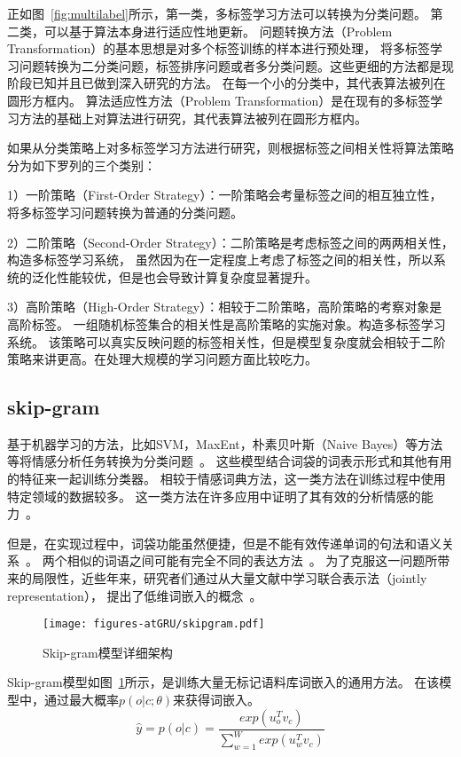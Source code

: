 正如图~\ref{fig:multilabel}所示，第一类，多标签学习方法可以转换为分类问题。
第二类，可以基于算法本身进行适应性地更新。
问题转换方法（Problem Transformation）的基本思想是对多个标签训练的样本进行预处理，
将多标签学习问题转换为二分类问题，标签排序问题或者多分类问题。这些更细的方法都是现阶段已知并且已做到深入研究的方法。
在每一个小的分类中，其代表算法被列在圆形方框内。
算法适应性方法（Problem Transformation）是在现有的多标签学习方法的基础上对算法进行研究，其代表算法被列在圆形方框内。

如果从分类策略上对多标签学习方法进行研究，则根据标签之间相关性将算法策略分为如下罗列的三个类别：

1）一阶策略（First-Order Strategy）：一阶策略会考量标签之间的相互独立性，将多标签学习问题转换为普通的分类问题。

2）二阶策略（Second-Order Strategy）：二阶策略是考虑标签之间的两两相关性，构造多标签学习系统，
虽然因为在一定程度上考虑了标签之间的相关性，所以系统的泛化性能较优，但是也会导致计算复杂度显著提升。

3）高阶策略（High-Order Strategy）：相较于二阶策略，高阶策略的考察对象是高阶标签。
一组随机标签集合的相关性是高阶策略的实施对象。构造多标签学习系统。
该策略可以真实反映问题的标签相关性，但是模型复杂度就会相较于二阶策略来讲更高。在处理大规模的学习问题方面比较吃力。

\subsection{skip-gram}
基于机器学习的方法，比如SVM，MaxEnt，朴素贝叶斯（Naive Bayes）等方法等将情感分析任务转换为分类问题~。
这些模型结合词袋的词表示形式和其他有用的特征来一起训练分类器。
相较于情感词典方法，这一类方法在训练过程中使用特定领域的数据较多。
这一类方法在许多应用中证明了其有效的分析情感的能力~。

但是，在实现过程中，词袋功能虽然便捷，但是不能有效传递单词的句法和语义关系~。
两个相似的词语之间可能有完全不同的表达方法~。
为了克服这一问题所带来的局限性，近些年来，研究者们通过从大量文献中学习联合表示法（jointly representation），
提出了低维词嵌入的概念~。
\begin{figure}[h]
    \centering
    \texttt{[image: figures-atGRU/skipgram.pdf]}
    \caption{Skip-gram模型详细架构}
    \label{fig:skip-gram}
\end{figure}

Skip-gram模型如图~\ref{fig:skip-gram}所示，是训练大量无标记语料库词嵌入的通用方法。
在该模型中，通过最大概率${p\left(o|c;\theta \right)}$来获得词嵌入。
\begin{equation}
    \widehat{y}=p\left ( o|c \right )=\frac{exp\left ( u_{o}^{T} v_{c}\right )}{\sum_{w=1}^{W}exp\left ( u_{w}^{T} v_{c}\right )}
\end{equation}

